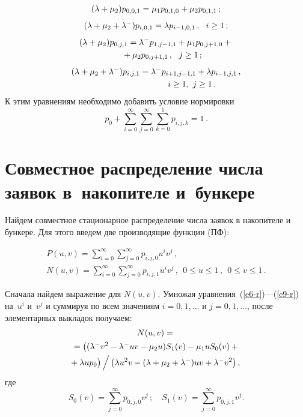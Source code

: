 \begin{multicols}{2}
\vspace*{-6pt}

\noindent
\begin{gather}
\label{e6-r}
(\lambda+\mu_2)p_{0,0,1}= \mu_1 p_{0,1,0} + \mu_2 p_{0,1,1}\,;
\\[4pt]
\label{e7-r}
(\lambda+\mu_2+\lambda^-)p_{i,0,1}=\lambda p_{i-1,0,1}\,,\ \ i \ge 1\,;
\\[4pt]
\label{e8-r}
(\lambda+\mu_2)p_{0,j,1}=\lambda^- p_{1,j-1,1}+ \mu_1 p_{0,j+1,0} +{}\notag\\
\hspace*{5mm}{}+ \mu_2 p_{0,j+1,1}\,,\ \ j \ge 1\,;
\\[4pt]
(\lambda+\mu_2+\lambda^-)p_{i,j,1}=\lambda^- p_{i+1,j-1,1} + \lambda 
p_{i-1,j,1}\,,\notag\\ 
\hspace*{30mm} i \ge 1, \ j \ge 1\,. \label{e9-r}
\end{gather}
К этим уравнениям необходимо добавить условие нормировки
\begin{equation}
\label{e10-r}
p_{0} + \sum\limits_{i=0}^{\infty} \sum\limits_{j=0}^{\infty}
\sum\limits_{k=0}^1 p_{i,j,k} = 1\,.
\end{equation}

\section{Совместное распределение числа заявок в~накопителе и~бункере}

Найдем совместное стационарное распределение
числа заявок в накопителе и бункере.
Для этого введем две производящие функции (ПФ):

\noindent
\begin{gather*}
P(u,v) = \sum\limits_{i=0}^{\infty}
\sum\limits_{j=0}^{\infty} p_{i,j,0} u^i v^j\,,\\
N(u,v) = \sum\limits_{i=0}^{\infty} \sum\limits_{j=0}^{\infty}
p_{i,j,1} u^i v^j\,,
\ \ 0 \le u \le 1\,, \ \ 0 \le v \le 1\,.
\end{gather*}

Сначала найдем выражение для $N(u,v)$. Умножая уравнения~(\ref{e6-r})---(\ref{e9-r})
на~$u^i$ и~$v^j$ и суммируя по всем значениям $i=0,1,\dots$ и $j=0,1,\dots$,
после элементарных выкладок получаем:
\begin{multline}
N(u,v)={}\\
{}=\left((\lambda^- v^2 - \lambda^- uv -  \mu_2 u ) S_1(v) - \mu_1 u S_0(v) + {}\right.\\
\!\!\!\!\!\left.{}+ \lambda u p_0
\vphantom{v^2}\right)\Big /
\left({\lambda u^2v - (\lambda + \mu_2 + \lambda^-)uv + \lambda^- v^2
}\right),\!\!
\label{e12-r}
\end{multline}
где
$$
S_0(v)=\sum\limits_{j=0}^{\infty}
p_{0,j,0} v^j\,; \quad
S_1(v)=\sum\limits_{j=0}^{\infty}
p_{0,j,1} v^j.
$$


\end{multicols}
